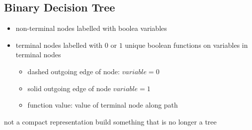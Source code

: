 \documentclass[a4paper, 10pt]{article}
\begin{document}
\subsection{Binary Decision Tree}
\begin{mdframed}[roundcorner=5pt,
subtitlebelowline=false,subtitleaboveline=false,
subtitlebackgroundcolor=blue!30,
frametitlerule=true,
frametitlebackgroundcolor=blue!30,
frametitle={Binary Decision Tree}
]
\begin{itemize}
    \item non-terminal nodes labelled with boolea variables
    \item terminal nodes labelled with $0$ or $1$
    unique boolean functions on variables in terminal nodes
    \begin{itemize}
        \item dashed outgoing edge of node: $variable=0$
        \item solid outgoing edge of node $variable=1$
        \item function value: value of terminal node along path
    \end{itemize}
\end{itemize}
\follows not a compact representation \follows build something that is no longer a tree
\end{mdframed}
\end{document}
